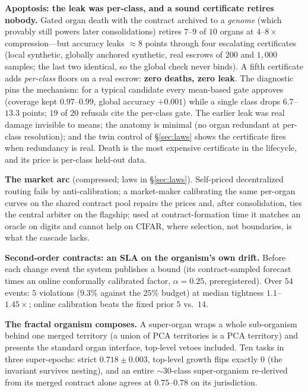 \documentclass{article}
\begin{document}
\textbf{Apoptosis: the leak was per-class, and a sound certificate retires
nobody.} Gated organ death with the contract archived to a \emph{genome}
(which provably still powers later consolidations) retires $7$--$9$ of $10$
organs at $4$--$8\times$ compression---but accuracy leaks $\approx 8$ points
through four escalating certificates (local synthetic, globally anchored
synthetic, real escrows of $200$ and $1{,}000$ samples; the last two
identical, so the global check never binds). A fifth certificate adds
\emph{per-class} floors on a real escrow: \textbf{zero deaths, zero leak}.
The diagnostic pins the mechanism: for a typical candidate every mean-based
gate approves (coverage kept $0.97$--$0.99$, global accuracy $+0.001$) while a
single class drops $6.7$--$13.3$ points; $19$ of $20$ refusals cite the
per-class gate. The earlier leak was real damage invisible to means; the
anatomy is minimal (no organ redundant at per-class resolution); and the twin
control of \S\ref{sec:laws} shows the certificate fires when redundancy is
real. Death is the most expensive certificate in the lifecycle, and its price
is per-class held-out data.

\textbf{The market arc} (compressed; laws in \S\ref{sec:laws}). Self-priced
decentralized routing fails by anti-calibration; a market-maker calibrating
the same per-organ curves on the shared contract pool repairs the prices and,
after consolidation, ties the central arbiter on the flagship; used at
contract-formation time it matches an oracle on digits and cannot help on
CIFAR, where selection, not boundaries, is what the cascade lacks.

\textbf{Second-order contracts: an SLA on the organism's own drift.} Before
each change event the system publishes a bound (its contract-sampled forecast
times an online conformally calibrated factor, $\alpha{=}0.25$,
preregistered). Over $54$ events: $5$ violations ($9.3\%$ against the $25\%$
budget) at median tightness $1.1$--$1.45\times$; online calibration beats the
fixed prior $5$ vs.\ $14$.

\textbf{The fractal organism composes.} A super-organ wraps a whole
sub-organism behind one merged territory (a union of PCA territories is a PCA
territory) and presents the standard organ interface, top-level vetoes
included. Ten tasks in three super-epochs: strict $0.718 \pm 0.003$,
top-level growth flips exactly $0$ (the invariant survives nesting), and an
entire $\sim$30-class super-organism re-derived from its merged contract
alone agrees at $0.75$--$0.78$ on its jurisdiction.
\end{document}
